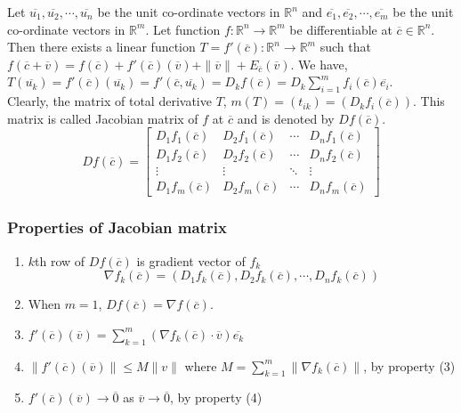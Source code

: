 	Let $\overline{u_1}, \overline{u_2}, \cdots, \overline{u_n}$ be the unit co-ordinate vectors in $\mathbb{R}^n$ and $\overline{e_1}, \overline{e_2}, \cdots, \overline{e_m}$ be the unit co-ordinate vectors in $\mathbb{R}^m$.
	Let function $f : \mathbb{R}^n \to \mathbb{R}^m$ be differentiable at $\overline{c} \in \mathbb{R}^n$.
	Then there exists a linear function $T = f'(\overline{c}) : \mathbb{R}^n \to \mathbb{R}^m$ such that $f(\overline{c}+\overline{v}) = f(\overline{c})+f'(\overline{c})(\overline{v}) + \|\overline{v}\|+E_{\overline{c}}(\overline{v})$.
	We have, $T(\overline{u_k}) = f'(\overline{c})(\overline{u_k}) = f'(\overline{c},\overline{u_k}) = D_kf(\overline{c}) = D_k \sum_{i=1}^m f_i(\overline{c})\overline{e_i}$.\\

	Clearly, the matrix of total derivative $T$, $m(T) = (t_{ik}) = (D_k f_i(\overline{c}))$.
	This matrix is called Jacobian matrix of $f$ at $\overline{c}$ and is denoted by $Df(\overline{c})$.
	\[ Df(\overline{c}) = \begin{bmatrix} D_1 f_1(\overline{c}) & D_2 f_1(\overline{c}) & \cdots & D_n f_1(\overline{c}) \\ D_1 f_2(\overline{c}) & D_2 f_2(\overline{c}) & \cdots & D_n f_2(\overline{c}) \\ \vdots & \vdots & \ddots & \vdots \\ D_1 f_m(\overline{c}) & D_2 f_m(\overline{c}) & \cdots & D_n f_m(\overline{c}) \end{bmatrix} \]

\subsubsection{Properties of Jacobian matrix}
\begin{enumerate}
	\item $k$th row of $Df(\overline{c})$ is gradient vector of $f_k$
		\[\nabla f_k(\overline{c}) = (D_1f_k(\overline{c}),D_2f_k(\overline{c}),\cdots,D_nf_k(\overline{c}))\]
	\item When $m = 1$, $Df(\overline{c}) = \nabla f(\overline{c})$.
	\item $f'(\overline{c})(\overline{v}) = \sum_{k=1}^m \left(\nabla f_k(\overline{c}) \cdot \overline{v}\right) \overline{e_k}$
	\item $\|f'(\overline{c})(\overline{v})\| \le M\|v\|$ where $M = \sum_{k=1}^m \|\nabla f_k(\overline{c})\| $, by property (3)
	\item $f'(\overline{c})(\overline{v}) \to \overline{0}$ as $\overline{v} \to \overline{0}$, by property (4)
\end{enumerate}


